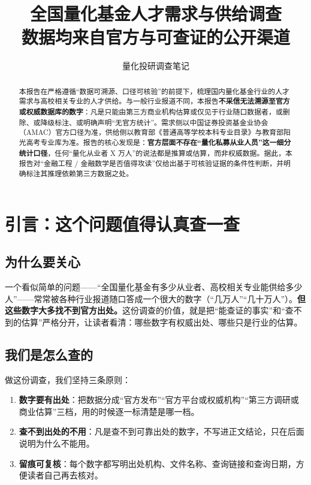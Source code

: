 \documentclass[UTF8,11pt]{ctexart}
\title{\bfseries 全国量化基金人才需求与供给调查\\[6pt]\large 数据均来自官方与可查证的公开渠道}
\author{量化投研调查笔记}
\date{}
\begin{document}
\maketitle

\begin{abstract}
本报告在严格遵循“数据可溯源、口径可核验”的前提下，梳理国内量化基金行业的人才需求与高校相关专业的人才供给。与一般行业报道不同，本报告\textbf{不采信无法溯源至官方或权威数据库的数字}：凡是只能由第三方商业机构估算或仅见于行业随口数据者，或删除、或降级标注、或明确声明“无官方统计”。需求侧以中国证券投资基金业协会（AMAC）官方口径为准，供给侧以教育部《普通高等学校本科专业目录》与教育部阳光高考专业库为准。报告的核心发现是：\textbf{官方层面不存在“量化私募从业人员”这一细分统计口径}，任何“量化从业者 X 万人”的说法都是推算或估算，而非权威数据。据此，本报告对“金融工程 / 金融数学是否值得攻读”仅给出基于可核验证据的条件性判断，并明确标注其推理依赖第三方数据之处。
\end{abstract}

\tableofcontents
\newpage

\section{引言：这个问题值得认真查一查}

\subsection{为什么要关心}
一个看似简单的问题——“全国量化基金有多少从业者、高校相关专业能供给多少人”——常常被各种行业报道随口答成一个很大的数字（“几万人”“几十万人”）。\textbf{但这些数字大多找不到官方出处。}这份调查的价值，就是把“能查证的事实”和“查不到的估算”严格分开，让读者看清：哪些数字有权威出处、哪些只是行业的估算。

\subsection{我们是怎么查的}
做这份调查，我们坚持三条原则：
\begin{enumerate}[itemsep=2pt]
\item \textbf{数字要有出处}：把数据分成“官方发布”“官方平台或权威机构”“第三方调研或商业估算”三档，用的时候逐一标清楚是哪一档。
\item \textbf{查不到出处的不用}：凡是查不到可靠出处的数字，不写进正文结论，只在后面说明为什么不能用。
\item \textbf{留痕可复核}：每个数字都写明出处机构、文件名称、查询链接和查询日期，方便读者自己再去核对。
\end{enumerate}
\end{document}
